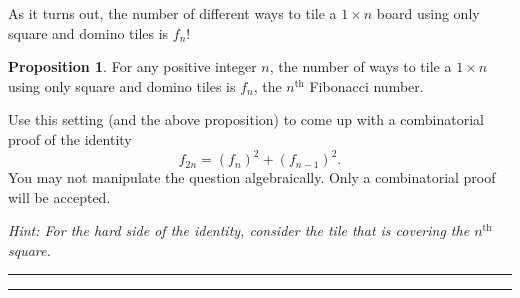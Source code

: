 \documentclass{article}
\theoremstyle{definition}
\newtheorem*{proposition}{Proposition} %
\newenvironment{solution}{\bigskip\hrule{\hfill}}{\bigskip\hrule{\hfill}} %
\begin{document}
\noindent As it turns out, the number of different ways to tile a $1\times n$ board using only square and domino tiles is $f_n$! 
\begin{proposition}
    For any positive integer $n$, the number of ways to tile a $1\times n$ using only square and domino tiles is $f_n$, the $n^{\text{th}}$ Fibonacci number.
\end{proposition}

\bigskip

\noindent Use this setting (and the above proposition) to come up with a combinatorial proof of the identity $$f_{2n}=\left(f_n\right)^2+\left(f_{n-1}\right)^2.$$ You may not manipulate the question algebraically. Only a combinatorial proof will be accepted. \bigskip

\noindent \emph{Hint: For the hard side of the identity, consider the tile that is covering the $n^\text{th}$ square.}
\begin{solution}


\end{solution}

\end{document}
